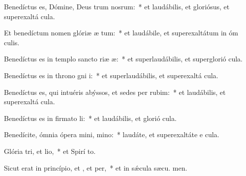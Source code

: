 \item Benedíctus es, Dómine, Deus trum nosrum:~* et laudábilis, et gloriósus, et superexaltá  cula.

\item Et benedíctum nomen glóriæ æ tum:~* et laudábile, et superexaltátum in óm culis.

\item Benedíctus es in templo sancto riæ æ:~* et superlaudábilis, et superglorió  cula.

\item Benedíctus es in throno gni i:~* et superlaudábilis, et superexaltá  cula.

\item Benedíctus es, qui intuéris abýssos, et sedes per rubim:~* et laudábilis, et superexaltá  cula.

\item Benedíctus es in firmato li:~* et laudábilis, et glorió  cula.

\item Benedícite, ómnia ópera mini, mino:~* laudáte, et superexaltáte e  cula.

\item Glória tri, et lio,~* et Spirí to.

\item Sicut erat in princípio, et , et per,~* et in sǽcula sæcu. men.